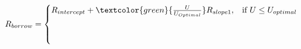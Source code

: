 \documentclass[preview]{standalone}
\begin{document}
\begin{align*}
R_{borrow} = \begin{cases} R_{intercept} + \textcolor{green}{\frac{ U }{ U _{Optimal}}}R_{slope1}, & \text{if }  U  \leq  U _{optimal} \\[6pt] & \text{ } \\ & \text{ } \end{cases}
\end{align*}
\end{document}
